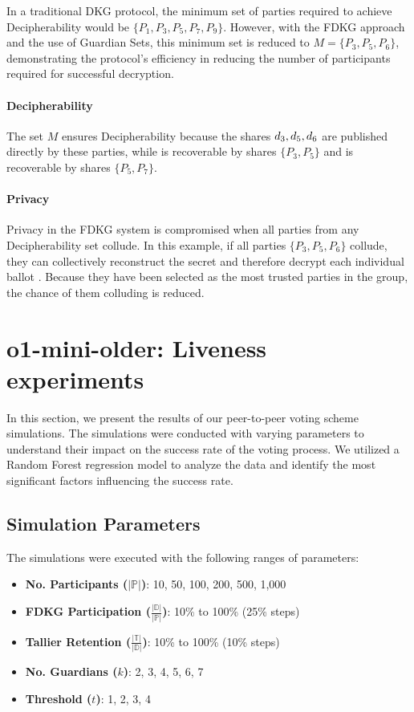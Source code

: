 \documentclass[runningheads]{llncs}
\begin{document}
In a traditional DKG protocol, the minimum set of parties required to achieve Decipherability would be \(\{P_1, P_3, P_5, P_7, P_9 \}\). However, with the FDKG approach and the use of Guardian Sets, this minimum set is reduced to \(M = \{P_3, P_5, P_6\}\), demonstrating the protocol's efficiency in reducing the number of participants required for successful decryption.

\paragraph{Decipherability}
The set $M$ ensures Decipherability because the shares $d_{3},d_{5},d_{6}$ are published directly by these parties, while  is recoverable by shares \(\{P_3, P_5\}\) and  is recoverable by shares \(\{P_5, P_7\}\).

\paragraph{Privacy}
Privacy in the FDKG system is compromised when all parties from any Decipherability set collude. In this example, if all parties \(\{P_3, P_5, P_6\}\) collude, they can collectively reconstruct the secret \DecryptionKey{} and therefore decrypt each individual ballot . Because they have been selected as the most trusted parties in the group, the chance of them colluding is reduced.


\section{o1-mini-older: Liveness experiments}

In this section, we present the results of our peer-to-peer voting scheme simulations. The simulations were conducted with varying parameters to understand their impact on the success rate of the voting process. We utilized a Random Forest regression model to analyze the data and identify the most significant factors influencing the success rate.

\subsection{Simulation Parameters}

The simulations were executed with the following ranges of parameters:

\begin{itemize}
    \item \textbf{No. Participants ($|\mathbb{P}|$)}: 10, 50, 100, 200, 500, 1,000
    \item \textbf{FDKG Participation ($\frac{|\mathbb{D}|}{|\mathbb{P}|}$)}: 10\% to 100\% (25\% steps)
    \item \textbf{Tallier Retention ($\frac{|\mathbb{T}|}{|\mathbb{D}|}$)}: 10\% to 100\% (10\% steps)
    
    \item \textbf{No. Guardians ($k$)}: 2, 3, 4, 5, 6, 7
    \item \textbf{Threshold ($t$)}: 1, 2, 3, 4
\end{itemize}
\end{document}
